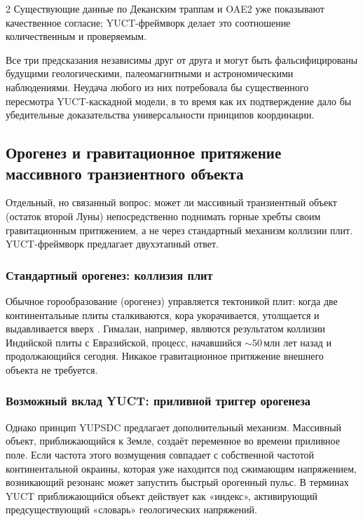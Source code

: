 \documentclass[11pt,a4paper]{article}
\begin{document}
\begin{multicols}{2}
		Существующие данные по Деканским траппам и OAE2 уже показывают качественное
		согласие; YUCT-фреймворк делает это соотношение количественным и проверяемым.
		
		Все три предсказания независимы друг от друга и могут быть фальсифицированы будущими геологическими, палеомагнитными и астрономическими наблюдениями. Неудача любого из них потребовала бы существенного пересмотра YUCT-каскадной модели, в то время как их подтверждение дало бы убедительные доказательства универсальности принципов координации.
		
		\subsection{Орогенез и гравитационное притяжение массивного транзиентного объекта}
		
		Отдельный, но связанный вопрос: может ли массивный транзиентный объект
		(остаток второй Луны) непосредственно поднимать горные хребты своим гравитационным притяжением,
		а не через стандартный механизм коллизии плит. YUCT-фреймворк предлагает двухэтапный ответ.
		
		\subsubsection{Стандартный орогенез: коллизия плит}
		
		Обычное горообразование (орогенез) управляется тектоникой плит:
		когда две континентальные плиты сталкиваются, кора укорачивается, утолщается
		и выдавливается вверх \cite{Kearey2013}. Гималаи, например, являются результатом коллизии Индийской плиты с Евразийской, процесс, начавшийся \(\sim 50\) млн лет назад и продолжающийся сегодня. Никакое гравитационное притяжение внешнего объекта не требуется.
		
		\subsubsection{Возможный вклад YUCT: приливной триггер орогенеза}
		
		Однако принцип YUPSDC предлагает дополнительный механизм. Массивный объект,
		приближающийся к Земле, создаёт переменное во времени приливное поле.
		Если частота этого возмущения совпадает с собственной частотой континентальной окраины, которая уже находится под сжимающим напряжением, возникающий резонанс может запустить быстрый орогенный пульс. В терминах YUCT приближающийся объект действует как «индекс», активирующий предсуществующий «словарь» геологических напряжений.
		

\end{multicols}
\end{document}
